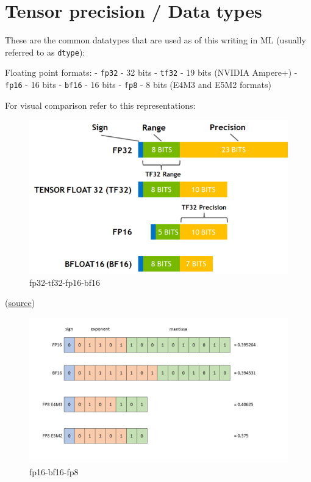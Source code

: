 \documentclass[
]{report}
\author{}
\date{2024-02-20}
\begin{document}
\chapter{Tensor precision / Data
types}\label{tensor-precision-data-types}

These are the common datatypes that are used as of this writing in ML
(usually referred to as \texttt{dtype}):

Floating point formats: - \texttt{fp32} - 32 bits - \texttt{tf32} - 19
bits (NVIDIA Ampere+) - \texttt{fp16} - 16 bits - \texttt{bf16} - 16
bits - \texttt{fp8} - 8 bits (E4M3 and E5M2 formats)

For visual comparison refer to this representations:

\begin{figure}[H]

{\centering \includegraphics{./images/fp32-tf32-fp16-bf16.png}

}

\caption{fp32-tf32-fp16-bf16}

\end{figure}%

(\href{https://developer.nvidia.com/blog/accelerating-ai-training-with-tf32-tensor-cores/}{source})

\begin{figure}[H]

{\centering \includegraphics{images/fp16-bf16-fp8.png}

}

\caption{fp16-bf16-fp8}

\end{figure}%
\end{document}
